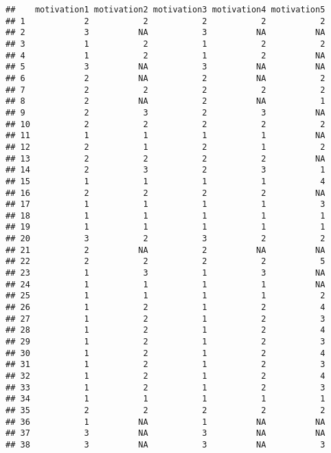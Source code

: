 \documentclass[]{article}
\begin{document}
\begin{verbatim}
##    motivation1 motivation2 motivation3 motivation4 motivation5
## 1            2           2           2           2           2
## 2            3          NA           3          NA          NA
## 3            1           2           1           2           2
## 4            1           2           1           2          NA
## 5            3          NA           3          NA          NA
## 6            2          NA           2          NA           2
## 7            2           2           2           2           2
## 8            2          NA           2          NA           1
## 9            2           3           2           3          NA
## 10           2           2           2           2           2
## 11           1           1           1           1          NA
## 12           2           1           2           1           2
## 13           2           2           2           2          NA
## 14           2           3           2           3           1
## 15           1           1           1           1           4
## 16           2           2           2           2          NA
## 17           1           1           1           1           3
## 18           1           1           1           1           1
## 19           1           1           1           1           1
## 20           3           2           3           2           2
## 21           2          NA           2          NA          NA
## 22           2           2           2           2           5
## 23           1           3           1           3          NA
## 24           1           1           1           1          NA
## 25           1           1           1           1           2
## 26           1           2           1           2           4
## 27           1           2           1           2           3
## 28           1           2           1           2           4
## 29           1           2           1           2           3
## 30           1           2           1           2           4
## 31           1           2           1           2           3
## 32           1           2           1           2           4
## 33           1           2           1           2           3
## 34           1           1           1           1           1
## 35           2           2           2           2           2
## 36           1          NA           1          NA          NA
## 37           3          NA           3          NA          NA
## 38           3          NA           3          NA           3
\end{verbatim}
\end{document}
